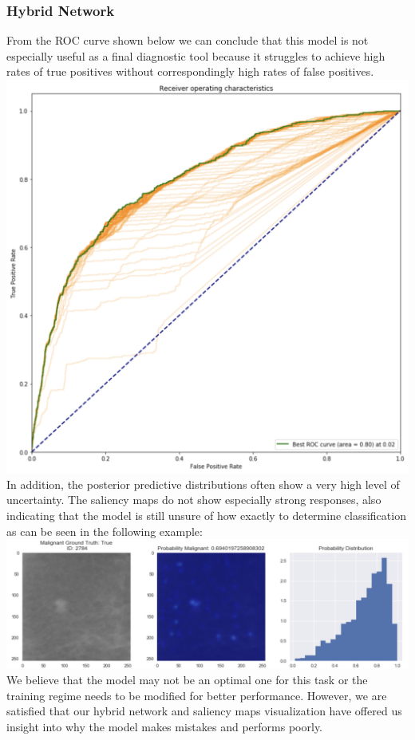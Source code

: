 \documentclass[12pt]{article}
\begin{document}
{\subsubsection*{Hybrid Network}
From the ROC curve shown below we can conclude that this model is not especially useful as a final diagnostic tool because it struggles to achieve high rates of true positives without correspondingly high rates of false positives. \\
\includegraphics[scale=0.5]{DDSM_ROC.png} \\
In addition, the posterior predictive distributions often show a very high level of uncertainty. The saliency maps do not show especially strong responses,  also indicating that the model is still unsure of how exactly to determine classification as can be seen in the following example: \\
\includegraphics[scale=0.5]{hybrid_model_confusion.png} \\
We believe that the model may not be an optimal one for this task or the training regime needs to be modified for better performance. However, we are satisfied that our hybrid network and saliency maps visualization have offered us insight into why the model makes mistakes and performs poorly.

}
\end{document}
